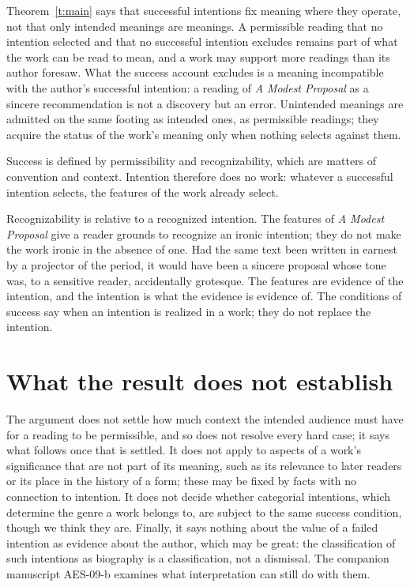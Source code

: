 \documentclass{situationist-preprint}
\begin{document}
\begin{reply}
Theorem~\ref{t:main} says that successful intentions fix meaning where they operate, not that only intended meanings are meanings. A permissible reading that no intention selected and that no successful intention excludes remains part of what the work can be read to mean, and a work may support more readings than its author foresaw. What the success account excludes is a meaning incompatible with the author's successful intention: a reading of \emph{A Modest Proposal} as a sincere recommendation is not a discovery but an error. Unintended meanings are admitted on the same footing as intended ones, as permissible readings; they acquire the status of the work's meaning only when nothing selects against them.
\end{reply}

\begin{objection}[Idleness]\label{o:idle}
Success is defined by permissibility and recognizability, which are matters of convention and context. Intention therefore does no work: whatever a successful intention selects, the features of the work already select.
\end{objection}

\begin{reply}
Recognizability is relative to a recognized intention. The features of \emph{A Modest Proposal} give a reader grounds to recognize an ironic intention; they do not make the work ironic in the absence of one. Had the same text been written in earnest by a projector of the period, it would have been a sincere proposal whose tone was, to a sensitive reader, accidentally grotesque. The features are evidence of the intention, and the intention is what the evidence is evidence of. The conditions of success say when an intention is realized in a work; they do not replace the intention.
\end{reply}

\section{What the result does not establish}

The argument does not settle how much context the intended audience must have for a reading to be permissible, and so does not resolve every hard case; it says what follows once that is settled. It does not apply to aspects of a work's significance that are not part of its meaning, such as its relevance to later readers or its place in the history of a form; these may be fixed by facts with no connection to intention. It does not decide whether categorial intentions, which determine the genre a work belongs to, are subject to the same success condition, though we think they are. Finally, it says nothing about the value of a failed intention as evidence about the author, which may be great: the classification of such intentions as biography is a classification, not a dismissal. The companion manuscript AES-09-b examines what interpretation can still do with them.
\end{document}
